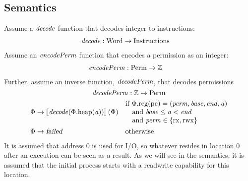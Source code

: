 \documentclass{article}
\newcommand{\sem}[1]{\left\llbracket #1 \right\rrbracket}
\newcommand{\var}[1]{\mathit{#1}}
\newcommand{\pcreg}{\mathrm{pc}}
\newcommand{\addr}{\var{a}}
\newcommand{\start}{\var{base}}
\newcommand{\addrend}{\var{end}}
\newcommand{\perm}{\var{perm}}
\newcommand{\stdcap}[1][\perm]{\left(#1,\start,\addrend,\addr \right)}
\newcommand{\plainproj}[1]{\mathrm{#1}}
\newcommand{\memheap}[1][\Phi]{#1.\plainproj{heap}}
\newcommand{\memreg}[1][\Phi]{#1.\plainproj{reg}}
\newcommand{\failed}{\textsl{failed}}
\newcommand{\plainfun}[2]{
  \ifthenelse{\equal{#2}{}}
             {\mathit{#1}}
             {\mathit{#1}(#2)}
}
\newcommand{\decode}{\plainfun{decode}{}}
\newcommand{\encodePerm}{\plainfun{encodePerm}{}}
\newcommand{\decodePerm}{\plainfun{decodePerm}{}}
\newcommand{\plaindom}[1]{\mathrm{#1}}
\newcommand{\Words}{\plaindom{Word}}
\newcommand{\Instrs}{\plaindom{Instructions}}
\newcommand{\ints}{\mathbb{Z}}
\newcommand{\Perms}{\plaindom{Perm}}
\newcommand{\plainperm}[1]{\mathrm{#1}}
\newcommand{\exec}{\plainperm{rx}}
\newcommand{\rwx}{\plainperm{rwx}}
\begin{document}
\subsection*{Semantics}
Assume a $\decode$ function that decodes integer to instructions:
\begin{align*}
\decode &:\Words \rightarrow \Instrs
\end{align*}
Assume an $\encodePerm$ function that encodes a permission as an integer:
\begin{align*}
\encodePerm &: \Perms \rightarrow \ints
\end{align*}
Further, assume an inverse function, $\decodePerm$, that decodes permissions
\[
  \decodePerm : \ints \rightarrow \Perms
\]
\begin{align*}
  \Phi & \rightarrow \sem{\decode(\memheap(\addr))}(\Phi) & &                                   
                                                              \arraycolsep=0pt
                                                              \begin{array}{l}
                                                                \text{if $\memreg(\pcreg) = \stdcap$}\\
                                                                \quad\text{and $\start \leq \addr < \addrend$}\\
                                                                \quad\text{and $\perm \in \{ \exec,\rwx \}$ }
                                                              \end{array}\\
\Phi & \rightarrow \failed                                 & & \text{otherwise}
\end{align*}
It is assumed that address 0 is used for I/O, so whatever resides in location 0 after an execution can be seen as a result. As we will see in the semantics, it is assumed that the initial process starts with a readwrite capability for this location.
\end{document}
